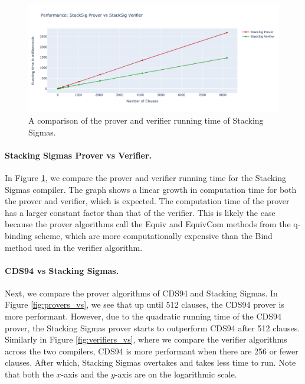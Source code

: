\begin{figure}[H]
  \centering
  \includegraphics[width=\linewidth]{../assets/plots/ss_vs.png}
  \caption{A comparison of the prover and verifier running time of Stacking Sigmas.}
  \label{fig:stacksig_vs}
\end{figure}

\paragraph{Stacking Sigmas Prover vs Verifier.} In Figure \ref{fig:stacksig_vs}, we compare the prover and verifier running time
for the Stacking Sigmas compiler. The graph shows a linear growth in computation time 
for both the prover and verifier, which is expected. The computation time of the prover has 
a larger constant factor than that of the verifier. This is likely the case 
because the prover algorithms call the \textsf{Equiv} and \textsf{EquivCom} 
methods from the q-binding scheme, which are more computationally expensive than
the \textsf{Bind} method used in the verifier algorithm.

\paragraph{CDS94 vs Stacking Sigmas.} Next, we compare the prover algorithms of CDS94 and Stacking Sigmas. In Figure \ref{fig:provers_vs}, we see that up until 512 clauses, the CDS94 prover is more 
performant. However, due to the quadratic running time of the CDS94 prover, the 
Stacking Sigmas prover starts to outperform CDS94 after 512 clauses. 
Similarly in Figure \ref{fig:verifiers_vs}, where we compare the verifier algorithms 
across the two compilers, CDS94 is more performant when there are 256 or fewer clauses. 
 After which, Stacking Sigmas overtakes and takes less time to run. Note that both the 
$x$-axis and the $y$-axis are on the logarithmic scale. 

